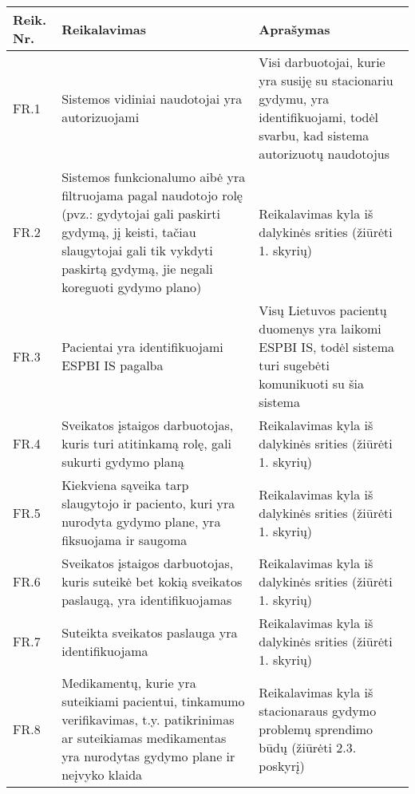 \begin{table}[!ht]
    \centering
    \renewcommand{\arraystretch}{1.2}
    \begin{tabular}{|m{3em}|m{17em}|m{17em}|}
    \hline 
    \rowcolor[HTML]{EFEFEF} 
    Reik. Nr. & Reikalavimas & Aprašymas \\ \hline

    FR.1  &  Sistemos vidiniai naudotojai yra autorizuojami  &  Visi darbuotojai, kurie yra susiję su stacionariu gydymu,  yra identifikuojami, todėl svarbu, kad sistema autorizuotų naudotojus       \\ \hline
    FR.2  &  Sistemos funkcionalumo aibė yra filtruojama pagal naudotojo rolę (pvz.: gydytojai gali paskirti gydymą, jį keisti, tačiau slaugytojai gali tik vykdyti paskirtą gydymą, jie negali koreguoti gydymo plano)&  Reikalavimas kyla iš dalykinės srities (žiūrėti 1. skyrių)       \\ \hline
    FR.3  &  Pacientai yra identifikuojami ESPBI IS pagalba  &  Visų Lietuvos pacientų duomenys yra laikomi ESPBI IS, todėl sistema turi sugebėti komunikuoti su šia sistema      \\ \hline
    FR.4  &  Sveikatos įstaigos darbuotojas, kuris turi atitinkamą rolę, gali sukurti gydymo planą  &   Reikalavimas kyla iš dalykinės srities (žiūrėti 1. skyrių)       \\ \hline
    FR.5  &  Kiekviena sąveika tarp slaugytojo ir paciento, kuri yra nurodyta gydymo plane, yra fiksuojama ir saugoma  &   Reikalavimas kyla iš dalykinės srities (žiūrėti 1. skyrių)       \\ \hline
    FR.6  &  Sveikatos įstaigos darbuotojas, kuris suteikė bet kokią sveikatos paslaugą, yra identifikuojamas  &   Reikalavimas kyla iš dalykinės srities (žiūrėti 1. skyrių)        \\ \hline
    FR.7  &  Suteikta sveikatos paslauga yra identifikuojama  &   Reikalavimas kyla iš dalykinės srities (žiūrėti 1. skyrių)      \\ \hline
    FR.8  &  Medikamentų, kurie yra suteikiami pacientui, tinkamumo verifikavimas, t.y. patikrinimas ar suteikiamas medikamentas yra nurodytas gydymo plane ir neįvyko klaida  &    Reikalavimas kyla iš stacionaraus gydymo problemų sprendimo būdų  (žiūrėti 2.3. poskyrį)       \\ \hline

    \end{tabular}
\end{table}

